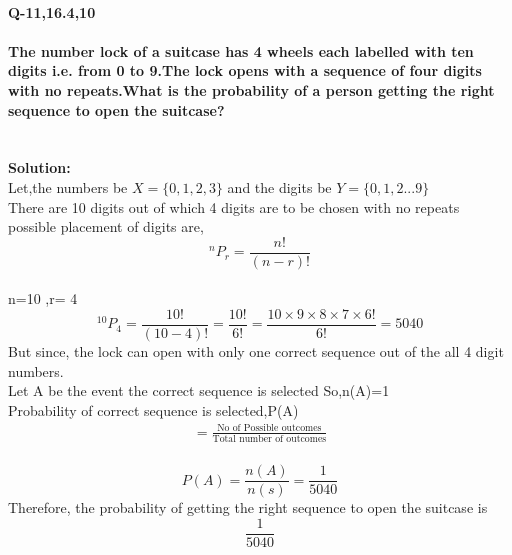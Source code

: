 \documentclass[10pt, a4paper]{article}
\title{\mytitle}
\author{\myauthor\hspace{1em} \\\contact\\FWC22094\hspace{6.5em}IITH\hspace{0.5em}\mymodule\hspace{6em}Module 2}
\date{}
\begin{document}
\maketitle
\paragraph*{\large Q-11,16.4,10}
\paragraph*{\large The number lock of a suitcase has 4 wheels each labelled with ten digits i.e. from 0 to 9.The lock opens with a sequence of four digits with no repeats.What is the probability of a person getting the right sequence to open the suitcase?}
\hspace{160mm}\\
\textbf{Solution:}\\
Let,the numbers be $X =\lbrace{0,1,2,3}\rbrace$ and the digits be $Y=\lbrace{0,1,2...9}\rbrace$\\
There are 10 digits out of which 4 digits are to be chosen with no repeats\\
possible placement of digits are,
\begin{equation}
^nP_r=\frac{n!}{(n-r)!}
\end{equation}
\\n=10 ,r= 4
\begin{equation}
^{10}P_4=\frac{10!}{(10-4)!}=\frac{10!}{6!}=\frac{10 \times 9 \times 8 \times 7 \times	 6!}{6!}=5040
\end{equation}
But since, the lock can open with only one correct sequence out of the all 4 digit numbers.
\\Let A be the event the correct sequence is selected So,n(A)=1
\\Probability of correct sequence is selected,P(A)
\\
\begin{align}
=\frac{\text{No of Possible outcomes}}{\text{Total number of outcomes}}
\end{align}\\
\begin{equation}
P(A)=\frac{n(A)}{n(s)}=\frac{1}{5040}
\end{equation}
Therefore, the probability of getting the right sequence to open the suitcase is 
\begin{equation}
\boxed{\frac{1}{5040}}
\end{equation}
\end{document}
